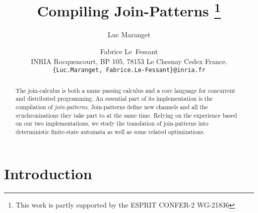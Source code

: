 
\addtolength{\topmargin}{-1cm}



\def\showgraph{\par\medskip\centerline{\begin{toimage}
\box\graph
\end{toimage}
\imageflush}\medskip}
\def\status#1{{\tt #1}}

\title{Compiling Join-Patterns
\footnote{
This work is partly supported by the ESPRIT 
    CONFER-2 WG-21836}}
\author {Luc Maranget \and Fabrice
Le~Fessant\\[.5em]
INRIA Rocquencourt, 
    BP 105, 78153 Le Chesnay Cedex France.
\\[.5em]
{\tt\small \{Luc.Maranget, Fabrice.Le-Fessant\}@inria.fr}
}

\date {}






\maketitle
\thispagestyle{empty}

\begin{abstract}
  
  The join-calculus is both a name passing calculus and a core
  language for concurrent and distributed programming.  An essential
  part of its implementation is the compilation of {\em
    join-patterns}.  Join-patterns define new channels and all the
  synchronizations they take part to at the same time.  Relying on the
  experience based on our two implementations, we study the
  translation of join-patterns into deterministic finite-state
  automata as well as some related optimizations.

  
\end{abstract}

\section {Introduction}

